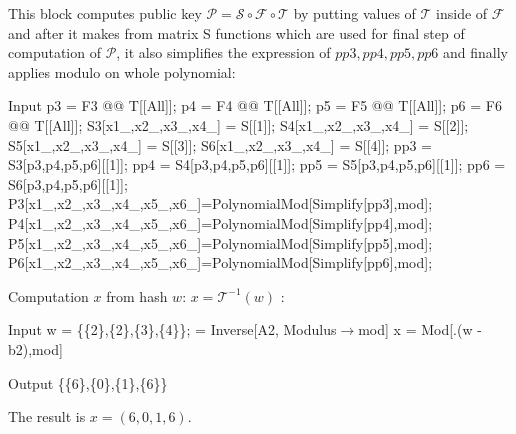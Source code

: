 \documentclass[thesis=M,english]{FITthesis}[2019/12/23]
\begin{document}
\noindent
This block computes public key $\mathcal{P} = \mathcal{S} \circ \mathcal{F} \circ \mathcal{T}$ by putting values of $\mathcal{T}$ inside of $\mathcal{F}$ and after it makes from matrix S functions which are used for final step of computation of $\mathcal{P}$, it also simplifies the expression of $pp3,pp4,pp5,pp6$ and finally applies modulo on whole polynomial:
\begin{mmaCell}[moredefined={p3, p4, p5, p6, S3, S4, S5, S6, mod, P3, P4, P5, P6, pp3,pp4,pp5,pp6, F3, F4, F5,F6, T, S},morepattern={x1_, x2_, x3_, x4_, x5_, x6_},leftmargin=1.5em]{Input}
p3 = F3 @@ T[[All]];
p4 = F4 @@ T[[All]];
p5 = F5 @@ T[[All]];
p6 = F6 @@ T[[All]];
S3[x1_,x2_,x3_,x4_] = S[[1]];
S4[x1_,x2_,x3_,x4_] = S[[2]];
S5[x1_,x2_,x3_,x4_] = S[[3]];
S6[x1_,x2_,x3_,x4_] = S[[4]];
pp3 = S3[p3,p4,p5,p6][[1]];
pp4 = S4[p3,p4,p5,p6][[1]];
pp5 = S5[p3,p4,p5,p6][[1]];
pp6 = S6[p3,p4,p5,p6][[1]];
P3[x1_,x2_,x3_,x4_,x5_,x6_]=PolynomialMod[Simplify[pp3],mod];
P4[x1_,x2_,x3_,x4_,x5_,x6_]=PolynomialMod[Simplify[pp4],mod];
P5[x1_,x2_,x3_,x4_,x5_,x6_]=PolynomialMod[Simplify[pp5],mod];
P6[x1_,x2_,x3_,x4_,x5_,x6_]=PolynomialMod[Simplify[pp6],mod];
\end{mmaCell}

\noindent
Computation $x$ from hash $w$: $x = \mathcal{T}^{-1}(w)$ :
\begin{mmaCell}[moredefined={w, A2, b2, S, x, mod}]{Input}
w = \{\{2\},\{2\},\{3\},\{4\}\};
 = Inverse[A2, Modulus\(\pmb{\to}\)mod]
x = Mod[.(w - b2),mod]
\end{mmaCell}
\begin{mmaCell}{Output}
  \{\{6\},\{0\},\{1\},\{6\}\}
\end{mmaCell}

\noindent
The result is $x = (6,0,1,6)$.
\end{document}
